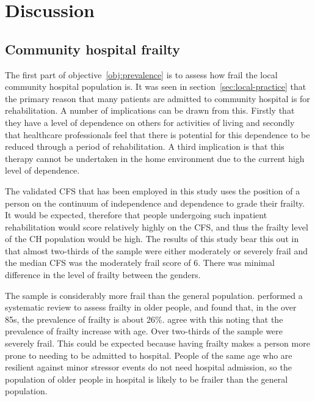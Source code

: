 \documentclass
[
	12pt,
	a4paper,
	oneside,
]{report}
\begin{document}
\chapter{Discussion}

\section{Community hospital frailty}

The first part of objective~\ref{obj:prevalence} is to assess how frail the
local community hospital population is. It was seen in 
section~\ref{sec:local-practice} that the primary reason that many patients are
admitted to community hospital is for rehabilitation. A number of implications 
can be 
drawn from this. Firstly that they have a level of dependence on others for 
activities 
of living and secondly that healthcare professionals feel that there is 
potential for this dependence to be reduced through a period of rehabilitation. A 
third implication is that this therapy cannot be undertaken in the home
environment due to the current high level of dependence.

The validated CFS that has been employed in this study uses the position of a person
on the continuum of independence and dependence to grade their frailty. It
would be expected, therefore that people undergoing such inpatient rehabilitation 
would score relatively highly on the CFS, and thus the frailty level of the 
CH population would be high. The results of this study bear this out in that
almost two-thirds of the sample were either moderately or severely frail
and the median CFS was the moderately frail score of 6. There was minimal
difference in the level of frailty between the genders.

The sample is considerably more frail than the general population. 
\textcite{collard:12} performed a systematic review to assess frailty in older
people, and found that, in the over 85s, the prevalence of frailty is about
26\%. \textcite{clegg:13} agree with this noting that the prevalence of frailty
increase with age. Over two-thirds of the sample were severely frail. This could
be expected because having frailty makes a person more prone to needing to be
admitted to hospital. People of the same age who are resilient against
minor stressor events do not need hospital admission, so the population of older
people in hospital is likely to be frailer than the general population.
\end{document}
